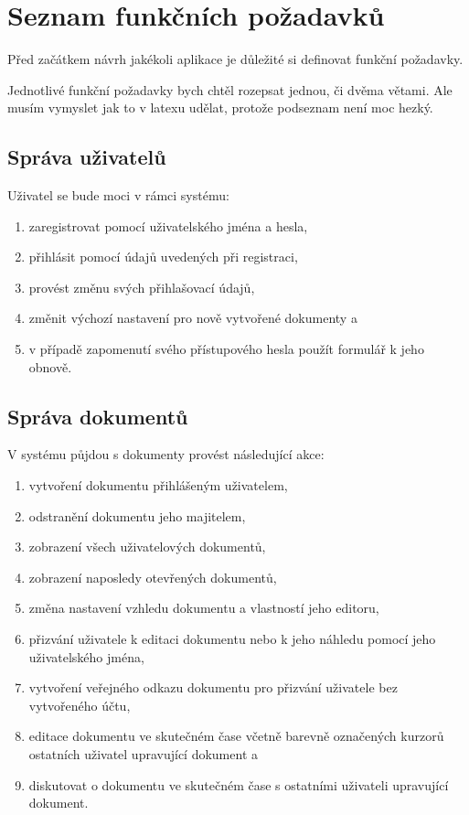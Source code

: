 
\section{Seznam funkčních požadavků}\label{sec:funcniPozadavky}
Před začátkem návrh jakékoli aplikace je důležité si definovat funkční požadavky.

Jednotlivé funkční požadavky bych chtěl rozepsat jednou, či dvěma větami.
Ale musím vymyslet jak to v latexu udělat, protože podseznam není moc hezký.

\subsection{Správa uživatelů}\label{subsec:správaUživatelů}

Uživatel se bude moci v rámci systému:
\begin{enumerate}[label=F1.\arabic*.]
    \item zaregistrovat pomocí uživatelského jména a hesla,
    \item přihlásit pomocí údajů uvedených při registraci,
    \item provést změnu svých přihlašovací údajů,
    \item změnit výchozí nastavení pro nově vytvořené dokumenty a
    \item v případě zapomenutí svého přístupového hesla použít formulář k jeho obnově.
\end{enumerate}

\subsection{Správa dokumentů}\label{subsec:správaDokumentů}

V systému půjdou s dokumenty provést následující akce:
\begin{enumerate}[label=F2.\arabic*.]
    \item vytvoření dokumentu přihlášeným uživatelem,
    \item odstranění dokumentu jeho majitelem,
    \item zobrazení všech uživatelových dokumentů,
    \item zobrazení naposledy otevřených dokumentů,
    \item změna nastavení vzhledu dokumentu a vlastností jeho editoru,
    \item přizvání uživatele k editaci dokumentu nebo k jeho náhledu pomocí jeho uživatelského jména,
    \item vytvoření veřejného odkazu dokumentu pro přizvání uživatele bez vytvořeného účtu,
    \item editace dokumentu ve skutečném čase včetně barevně označených kurzorů ostatních uživatel upravující dokument a
    \item diskutovat o dokumentu ve skutečném čase s ostatními uživateli upravující dokument.
\end{enumerate}

